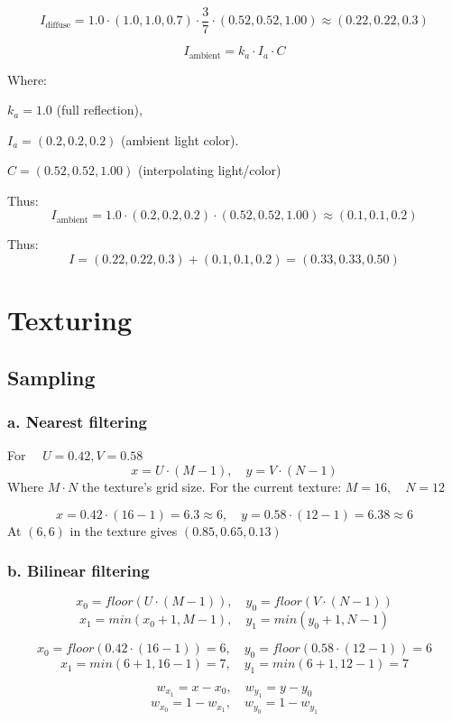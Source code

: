 \documentclass{article}
\begin{document}
$$
I_{\text{diffuse}} = 1.0 \cdot (1.0, 1.0, 0.7) \cdot \frac{3}{7} \cdot (0.52, 0.52, 1.00) \approx (0.22, 0.22, 0.3)
$$

$$
I_{\text{ambient}} = k_a \cdot I_a \cdot C
$$

Where:

$k_{a} = 1.0$ (full reflection),

$I_{a} = (0.2, 0.2, 0.2)$ (ambient light color).

$C = (0.52, 0.52, 1.00)$ (interpolating light/color)

Thus:
$$
I_{\text{ambient}} = 1.0 \cdot (0.2, 0.2, 0.2) \cdot (0.52, 0.52, 1.00) \approx (0.1, 0.1, 0.2)
$$

Thus:
$$
I = (0.22, 0.22, 0.3) + (0.1, 0.1, 0.2) = (0.33, 0.33, 0.50)
$$


\newpage
\section{Texturing}

\subsection{Sampling}

\subsubsection{a. \textbf{Nearest} filtering}
For $\quad U = 0.42, V = 0.58$
$$
x = U \cdot (M - 1), \quad y = V \cdot (N - 1)
$$
Where $M \cdot N$ the texture's grid size. For the current texture: $M = 16, \quad N = 12$

$$
x = 0.42 \cdot (16 - 1) = 6.3 \approx 6, \quad y = 0.58 \cdot (12 - 1) = 6.38 \approx 6
$$
At $(6, 6)$ in the texture gives $(0.85, 0.65, 0.13)$

\subsubsection{b. \textbf{Bilinear} filtering}
$$
x_0 = floor(U \cdot (M - 1)), \quad y_0 = floor(V \cdot (N - 1)) 
$$
$$
x_1 = min(x_0 + 1, M - 1), \quad y_1 = min(y_0 + 1, N - 1)
$$

$$
x_0 = floor(0.42 \cdot (16 - 1)) = 6, \quad y_0 = floor(0.58 \cdot (12 - 1))  = 6
$$
$$
x_1 = min(6 + 1, 16 - 1) = 7, \quad y_1 = min(6 + 1, 12 - 1) = 7
$$

$$
w_{x_1} = x - x_0, \quad w_{y_1} = y - y_0
$$
$$
w_{x_0} = 1 - w_{x_1}, \quad w_{y_0} = 1 - w_{y_1}
$$
\end{document}
